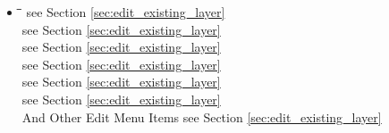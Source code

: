 \begin{itemize}
\item {}
\begin{tabbing}
\hspace{4.5cm}\=\hspace{3cm}\=\hspace{3.5cm}\= \kill
{} 
	\> 
	\> see Section \ref{sec:edit_existing_layer} 
	\>  \\
	\> 
	\> see Section \ref{sec:edit_existing_layer} 
	\>  \\
	\> 
	\> see Section \ref{sec:edit_existing_layer} 
	\>  \\
	\> 
	\> see Section \ref{sec:edit_existing_layer} 
	\>  \\
	\> \keystroke{/}
	\> see Section \ref{sec:edit_existing_layer} 
	\>  \\
	\> 
	\> see Section \ref{sec:edit_existing_layer} 
	\>  \\
And Other Edit Menu Items
	\>
	\> see Section \ref{sec:edit_existing_layer} 
	\>  \\
\end{tabbing}



\end{itemize}
